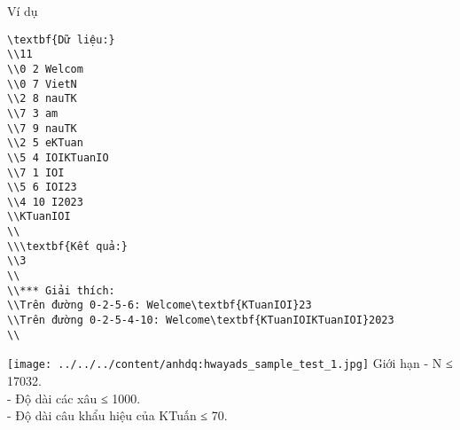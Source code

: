Ví dụ
\begin{verbatim}
\textbf{Dữ liệu:}
\\11
\\0 2 Welcom
\\0 7 VietN
\\2 8 nauTK
\\7 3 am
\\7 9 nauTK
\\2 5 eKTuan
\\5 4 IOIKTuanIO
\\7 1 IOI
\\5 6 IOI23
\\4 10 I2023
\\KTuanIOI
\\
\\\textbf{Kết quả:}
\\3
\\
\\*** Giải thích:
\\Trên đường 0-2-5-6: Welcome\textbf{KTuanIOI}23
\\Trên đường 0-2-5-4-10: Welcome\textbf{KTuanIOIKTuanIOI}2023
\\\end{verbatim}


\texttt{[image: ../../../content/anhdq:hwayads\_sample\_test\_1.jpg]}
Giới hạn
- N ≤ 17032.   
\\   - Độ dài các xâu ≤ 1000.   
\\   - Độ dài câu khẩu hiệu của KTuấn ≤ 70.